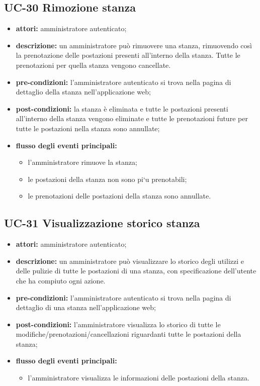 \subsection{UC-30 Rimozione stanza}
\begin{itemize}
    \item \textbf{attori:} amministratore autenticato;
    \item \textbf{descrizione:} un amministratore pu\`{o} rimuovere una stanza, rimuovendo cos\`{i} la prenotazione delle postazioni presenti all'interno della stanza. Tutte le prenotazioni per quella stanza vengono cancellate.
    \item \textbf{pre-condizioni:} l'amministratore autenticato si trova nella pagina di dettaglio della stanza nell'applicazione web;
    \item \textbf{post-condizioni:} la stanza \`{e} eliminata e tutte le postazioni presenti all'interno della stanza vengono eliminate e tutte le prenotazioni future per tutte le postazioni nella stanza sono annullate;
    \item \textbf{flusso degli eventi principali:}
    \begin{itemize}
        \item l'amministratore rimuove la stanza;
        \item le postazioni della stanza non sono pi`{u} prenotabili;
        \item le prenotazioni delle postazioni della stanza sono annullate.
    \end{itemize}
\end{itemize}



\subsection{UC-31 Visualizzazione storico stanza}
\begin{itemize}
    \item \textbf{attori:} amministratore autenticato;
    \item \textbf{descrizione:} un amministratore pu\`{o} visualizzare lo storico degli utilizzi e delle pulizie di tutte le postazioni di una stanza, con specificazione dell'utente che ha compiuto ogni azione.
    \item \textbf{pre-condizioni:} l'amministratore autenticato si trova nella pagina di dettaglio di una stanza nell'applicazione web;
    \item \textbf{post-condizioni:} l'amministratore visualizza lo storico di tutte le modifiche/prenotazioni/cancellazioni riguardanti tutte le postazioni della stanza;
    \item \textbf{flusso degli eventi principali:}
    \begin{itemize}
        \item l'amministratore visualizza le informazioni delle postazioni della stanza.
    \end{itemize}
\end{itemize}



